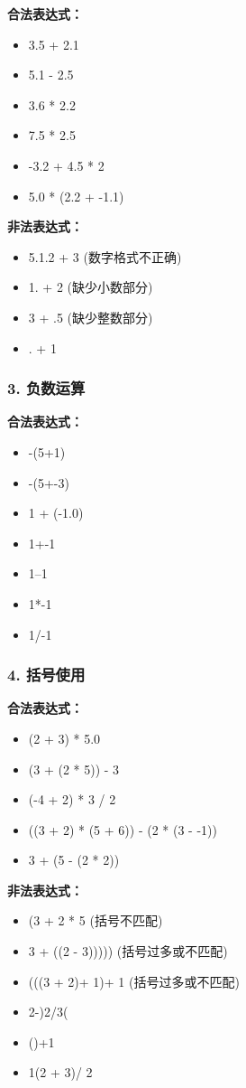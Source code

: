 \documentclass[fontset=fandol]{ctexart}
\begin{document}
\textbf{合法表达式：}
\begin{itemize}
  \item  3.5 + 2.1 
  \item  5.1 - 2.5 
  \item  3.6 * 2.2 
  \item  7.5 * 2.5 
  \item  -3.2 + 4.5 * 2 
  \item  5.0 * (2.2 + -1.1) 
\end{itemize}

\textbf{非法表达式：}
\begin{itemize}
  \item  5.1.2 + 3  \quad (数字格式不正确)
  \item  1. + 2  \quad (缺少小数部分)
  \item  3 + .5  \quad (缺少整数部分)
  \item  . + 1
\end{itemize}

\subsubsection*{3. 负数运算}

\textbf{合法表达式：}
\begin{itemize}
  \item -(5+1)
  \item -(5+-3)
  \item 1 + (-1.0)
  \item 1+-1
  \item 1--1
  \item 1*-1
  \item 1/-1
\end{itemize}


\subsubsection*{4. 括号使用}

\textbf{合法表达式：}
\begin{itemize}
  \item  (2 + 3) * 5.0
  \item  (3 + (2 * 5)) - 3 
  \item  (-4 + 2) * 3 / 2
  \item  ((3 + 2) * (5 + 6)) - (2 * (3 -  -1))
  \item  3 + (5 - (2 * 2)) 
\end{itemize}

\textbf{非法表达式：}
\begin{itemize}
  \item  (3 + 2 * 5  \quad (括号不匹配)
  \item  3 + ((2 - 3)))))  \quad (括号过多或不匹配)
  \item  (((3 + 2)+ 1)+ 1  \quad (括号过多或不匹配)
  \item  2-)2/3(
  \item  ()+1
  \item  1(2 + 3)/ 2
\end{itemize}
\end{document}
